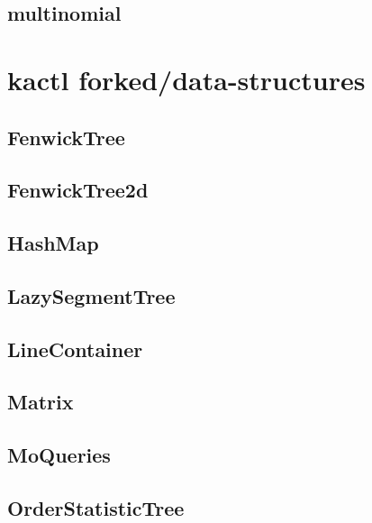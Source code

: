 \subsection{multinomial}
\raggedbottom
\hrulefill

\section{kactl forked/data-structures}
\subsection{FenwickTree}
\raggedbottom
\hrulefill
\subsection{FenwickTree2d}
\raggedbottom
\hrulefill
\subsection{HashMap}
\raggedbottom
\hrulefill
\subsection{LazySegmentTree}
\raggedbottom
\hrulefill
\subsection{LineContainer}
\raggedbottom
\hrulefill
\subsection{Matrix}
\raggedbottom
\hrulefill
\subsection{MoQueries}
\raggedbottom
\hrulefill
\subsection{OrderStatisticTree}
\raggedbottom
\hrulefill
